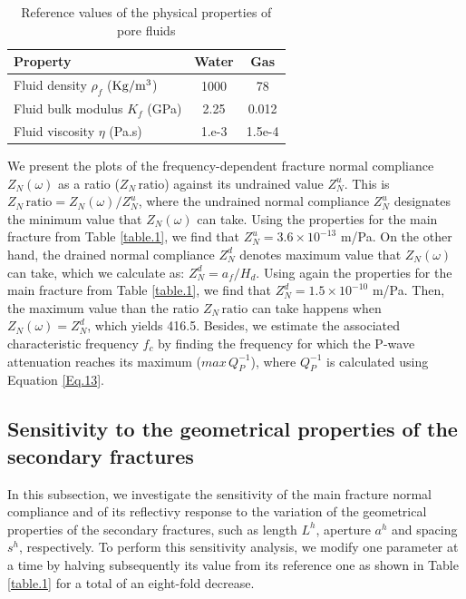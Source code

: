 \documentclass[draft]{agujournal2019}
\begin{document}
\begin{table}[!ht]
  \caption{Reference values of the physical properties of pore fluids}
\begin{center}
  \begin{tabular}{ | l  c  c |  }
    \hline
    Property & Water & Gas\\ \hline
    Fluid density $\rho_f$ ($\rm{Kg/m^3}$) & 1000 & 78\\
    Fluid bulk modulus $K_f$ (\rm{GPa}) & 2.25 & 0.012\\
    Fluid viscosity $\eta$ (\rm{Pa.s})& 1.e-3 & 1.5e-4\\
    \hline
  \end{tabular}
  \label{table.2}
\end{center}
\end{table}
We present the plots of the frequency-dependent fracture normal compliance $Z_N (\omega)$ as a ratio ($Z_N\, \text{ratio}$) against its undrained value $Z^u_{N}$. This is $Z_N\, \text{ratio}=Z_N (\omega)/ Z^u_{N}$, where the undrained normal compliance  $Z^u_{N}$ designates the minimum value that $Z_N (\omega)$ can take. Using the properties for the main fracture from Table \ref{table.1}, we  find that $Z^u_{N} =3.6 \times 10 ^{-13}$  m/Pa. On the other hand, the drained normal compliance $Z^d_{N}$ denotes maximum value that $Z_N (\omega)$ can take, which we calculate as:
$Z^d_{N}= a_f/H_d$. Using again the properties for the main fracture from Table \ref{table.1}, we find that $Z^d_{N} =1.5\times 10^{-10} $ m/Pa. Then, the maximum value than the ratio $Z_N\, \text{ratio}$  can take happens when  $Z_N (\omega) = Z^d_{N} $, which yields 416.5. Besides,
we estimate the associated characteristic frequency $f_c$ by finding the frequency for which the P-wave attenuation reaches its maximum ($max\, Q_P^{-1}$), where $Q_P^{-1}$ is calculated using Equation \eqref{Eq.13}.


\subsection{Sensitivity to the geometrical properties of the secondary fractures}
In this subsection, we investigate the sensitivity of the main fracture normal compliance and of its reflectivy response to the variation of the geometrical properties of the secondary fractures, such as length $L^h$, aperture $a^h $ and spacing $s^h$, respectively. To perform this sensitivity analysis, we modify one parameter at a time by halving subsequently its value from its reference one as shown in Table \ref{table.1} for a total of an eight-fold decrease.
\end{document}
